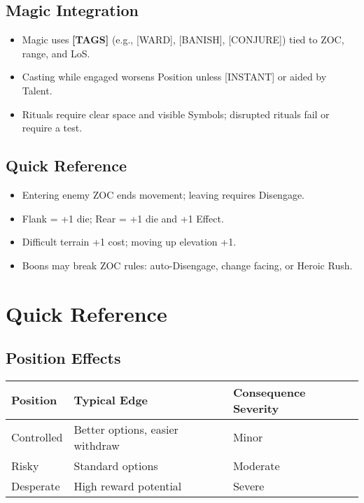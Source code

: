 \subsection{Magic Integration}
\begin{itemize}
  \item Magic uses \textbf{[TAGS]} (e.g., [WARD], [BANISH], [CONJURE]) tied to ZOC, range, and LoS.
  \item Casting while engaged worsens Position unless [INSTANT] or aided by Talent.
  \item Rituals require clear space and visible Symbols; disrupted rituals fail or require a test.
\end{itemize}

\subsection{Quick Reference}
\begin{itemize}
  \item Entering enemy ZOC ends movement; leaving requires Disengage.
  \item Flank = +1 die; Rear = +1 die and +1 Effect.
  \item Difficult terrain +1 cost; moving up elevation +1.
  \item Boons may break ZOC rules: auto-Disengage, change facing, or Heroic Rush.
\end{itemize}

\section{Quick Reference}
\label{sec:combat-quick-ref}

\subsection{Position Effects}
\label{subsec:position-quick-ref}
\begin{center}
\begin{tabular}{lll}
\toprule
\textbf{Position} & \textbf{Typical Edge} & \textbf{Consequence Severity} \\
\midrule
Controlled & Better options, easier withdraw & Minor \\
Risky      & Standard options               & Moderate \\
Desperate  & High reward potential           & Severe \\
\bottomrule
\end{tabular}
\end{center}

